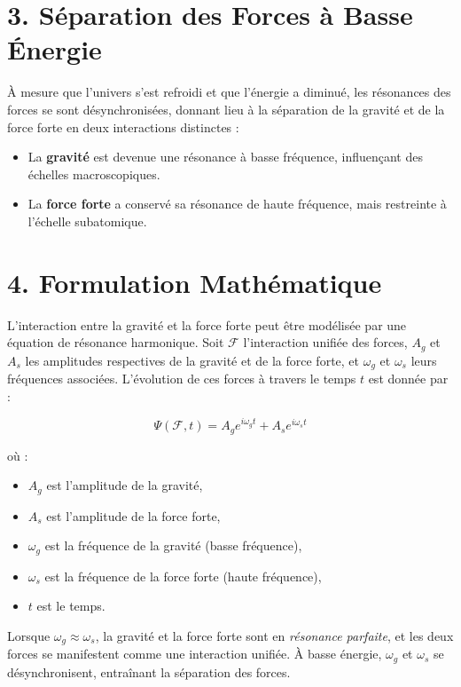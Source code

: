 \documentclass{article}
\begin{document}
\section{3. Séparation des Forces à Basse Énergie}

À mesure que l'univers s'est refroidi et que l'énergie a diminué, les résonances des forces se sont désynchronisées, donnant lieu à la séparation de la gravité et de la force forte en deux interactions distinctes :
\begin{itemize}
    \item La \textbf{gravité} est devenue une résonance à basse fréquence, influençant des échelles macroscopiques.
    \item La \textbf{force forte} a conservé sa résonance de haute fréquence, mais restreinte à l'échelle subatomique.
\end{itemize}

\section{4. Formulation Mathématique}

L'interaction entre la gravité et la force forte peut être modélisée par une équation de résonance harmonique. Soit \( \mathcal{F} \) l'interaction unifiée des forces, \( A_g \) et \( A_s \) les amplitudes respectives de la gravité et de la force forte, et \( \omega_g \) et \( \omega_s \) leurs fréquences associées. L'évolution de ces forces à travers le temps \( t \) est donnée par :

\[
\Psi(\mathcal{F}, t) = A_g e^{i\omega_g t} + A_s e^{i\omega_s t}
\]

où :
\begin{itemize}
    \item \( A_g \) est l'amplitude de la gravité,
    \item \( A_s \) est l'amplitude de la force forte,
    \item \( \omega_g \) est la fréquence de la gravité (basse fréquence),
    \item \( \omega_s \) est la fréquence de la force forte (haute fréquence),
    \item \( t \) est le temps.
\end{itemize}

Lorsque \( \omega_g \approx \omega_s \), la gravité et la force forte sont en \textit{résonance parfaite}, et les deux forces se manifestent comme une interaction unifiée. À basse énergie, \( \omega_g \) et \( \omega_s \) se désynchronisent, entraînant la séparation des forces.
\end{document}
